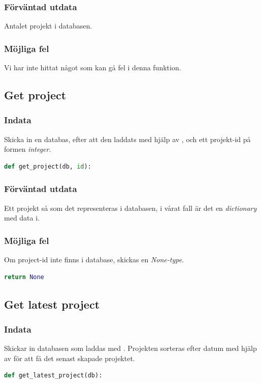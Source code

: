\documentclass{TDP003mall}
\begin{document}
\subsubsection{Förväntad utdata}
Antalet projekt i databasen. 
\subsubsection{Möjliga fel}
Vi har inte hittat något som kan gå fel i denna funktion.

\subsection{Get project}
\subsubsection{Indata}
Skicka in en databas, efter att den laddats med hjälp av \uline{}, och ett projekt-id på formen \textit{integer}.
\begin{lstlisting}[caption={Definering av \textbf{get\_project()} funktionen.}, language=Python]
def get_project(db, id):
\end{lstlisting}
\subsubsection{Förväntad utdata}
Ett projekt så som det representeras i databasen, i vårat fall är det en \textit{dictionary} med data i.
\subsubsection{Möjliga fel}
Om project-id inte finns i database, skickas en \textit{None-type}.  
\begin{lstlisting}[caption={Retur ifall inget projekt hittas}, language={Python}]
return None
\end{lstlisting}
\subsection{Get latest project}
\subsubsection{Indata}
Skickar in databasen som laddas med \uline{}.
Projekten sorteras efter datum med hjälp av \uline{} för att få det senast skapade projektet.
\begin{lstlisting}[caption={Definering av \textbf{get\_latest\_project()} funktionen.}, language=Python]
def get_latest_project(db):
\end{lstlisting}
\end{document}
